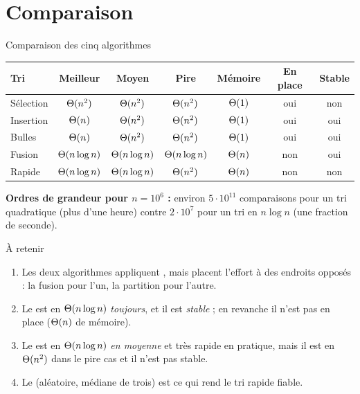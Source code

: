 \documentclass[11pt,aspectratio=169]{beamer}
\begin{document}
\section{Comparaison}

\begin{frame}{Comparaison des cinq algorithmes}
\begin{center}\scriptsize
\begin{tabular}{lcccccc}
\toprule
\textbf{Tri} & \textbf{Meilleur} & \textbf{Moyen} & \textbf{Pire} & \textbf{Mémoire} & \textbf{En place} & \textbf{Stable}\\
\midrule
Sélection & $\Theta(n^2)$ & $\Theta(n^2)$ & $\Theta(n^2)$ & $\Theta(1)$ & oui & non\\
Insertion & $\Theta(n)$ & $\Theta(n^2)$ & $\Theta(n^2)$ & $\Theta(1)$ & oui & oui\\
Bulles & $\Theta(n)$ & $\Theta(n^2)$ & $\Theta(n^2)$ & $\Theta(1)$ & oui & oui\\
\midrule
\rowcolor{tealclair}
Fusion & $\Theta(n\log n)$ & $\Theta(n\log n)$ & $\Theta(n\log n)$ & $\Theta(n)$ & non & oui\\
\rowcolor{tealclair}
Rapide & $\Theta(n\log n)$ & $\Theta(n\log n)$ & $\Theta(n^2)$ & $\Theta(n)$ & non & non\\
\bottomrule
\end{tabular}
\end{center}
\vspace{8pt}
\begin{encadre}\small
\textbf{Ordres de grandeur pour $n=10^6$ :} environ $5\cdot10^{11}$ comparaisons pour un
tri quadratique (plus d'une heure) contre $2\cdot10^{7}$ pour un tri en $n\log n$
(une fraction de seconde).
\end{encadre}
\end{frame}

\begin{frame}{À retenir}
\begin{encadre}[title=Quatre points,fonttitle=\bfseries]
\begin{enumerate}\setlength\itemsep{3pt}
  \item Les deux algorithmes appliquent , mais placent
        l'effort à des endroits opposés : la fusion pour l'un, la partition pour l'autre.
  \item Le  est en $\Theta(n\log n)$ \emph{toujours}, et il est
        \emph{stable} ; en revanche il n'est pas en place ($\Theta(n)$ de mémoire).
  \item Le  est en $\Theta(n\log n)$ \emph{en moyenne} et très
        rapide en pratique, mais il est en $\Theta(n^2)$ dans le pire cas et il n'est
        pas stable.
  \item Le  (aléatoire, médiane de trois) est ce qui rend le
        tri rapide fiable.
\end{enumerate}
\end{encadre}
\end{frame}
\end{document}
